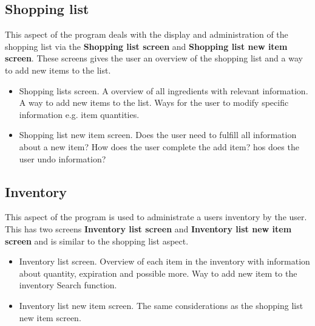 \subsection{Shopping list}
This aspect of the program deals with the display and administration of the shopping list via the \textbf{Shopping list screen} and \textbf{Shopping list new item screen}. These screens gives the user an overview of the shopping list and a way to add new items to the list.

\begin{itemize}
	\item Shopping lists screen.
		\subitem A overview of all ingredients with relevant information.
		\subitem A way to add new items to the list.
		\subitem Ways for the user to modify specific information e.g. item quantities.
	\item Shopping list new item screen.
		\subitem Does the user need to fulfill all information about a new item?
		\subitem How does the user complete the add item?
		\subitem hos does the user undo information? 
\end{itemize}

\subsection{Inventory}
This aspect of the program is used to administrate a users inventory by the user. This has two screens
\textbf{Inventory list screen} and \textbf{Inventory list new item screen} and is similar to the shopping list aspect. 
    
\begin{itemize}
	\item Inventory list screen.
		\subitem Overview of each item in the inventory with information about quantity, expiration and possible more.
		\subitem Way to add new item to the inventory
		\subitem Search function.
	\item Inventory list new item screen.
		\subitem The same considerations as the shopping list new item screen.
\end{itemize}


